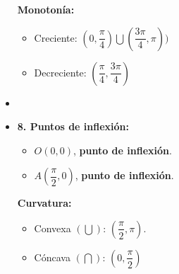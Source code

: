 \begin{itemize}
\begin{itemize}
	\end{itemize}
	\textbf{Monotonía: }\\
	\begin{itemize}
		\item Creciente: $(0, \dfrac{\pi}{4}) \bigcup (\dfrac{3\pi}{4}, \pi))$
		\item Decreciente: $(\dfrac{\pi}{4}, \dfrac{3\pi}{4})$
	\end{itemize}\item 
	\item \textbf{8. Puntos de inflexión:}\\
	\begin{itemize}
		\item $O(0,0)$, \textbf{punto de inflexión}.
		\item $A(\dfrac{\pi}{2},0)$, \textbf{punto de inflexión}.
	\end{itemize}
	\textbf{Curvatura: }\\
	\begin{itemize}
		\item Convexa $(\bigcup)$: $(\dfrac{\pi}{2}, \pi)$.
		\item Cóncava $(\bigcap)$: $(0, \dfrac{\pi}{2})$
	\end{itemize}
\end{itemize}

